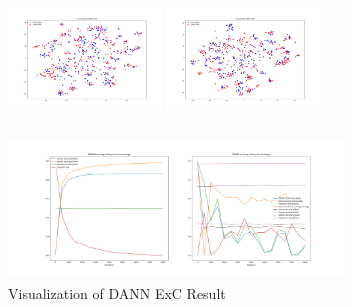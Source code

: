 \documentclass[conference]{IEEEtran}
\begin{document}
\begin{figure}[htb]
\centering
\begin{minipage}[t]{0.26\textwidth}
\includegraphics[width=1.6in, height=1.5in]{Ldann/std_C2R/before.png}
\end{minipage}%
\begin{minipage}[t]{0.26\textwidth}
\includegraphics[width=1.6in, height=1.5in]{Ldann/std_C2R/after.png}
\end{minipage}%
\begin{minipage}[t]{0.45\textwidth}
\includegraphics[width=3.5in, height=1.5in]{Ldann/std_C2R/dann.png}
\end{minipage}%
\caption{Visualization of DANN ExC Result}\label{fig:ExC2}
\end{figure}
\end{document}
